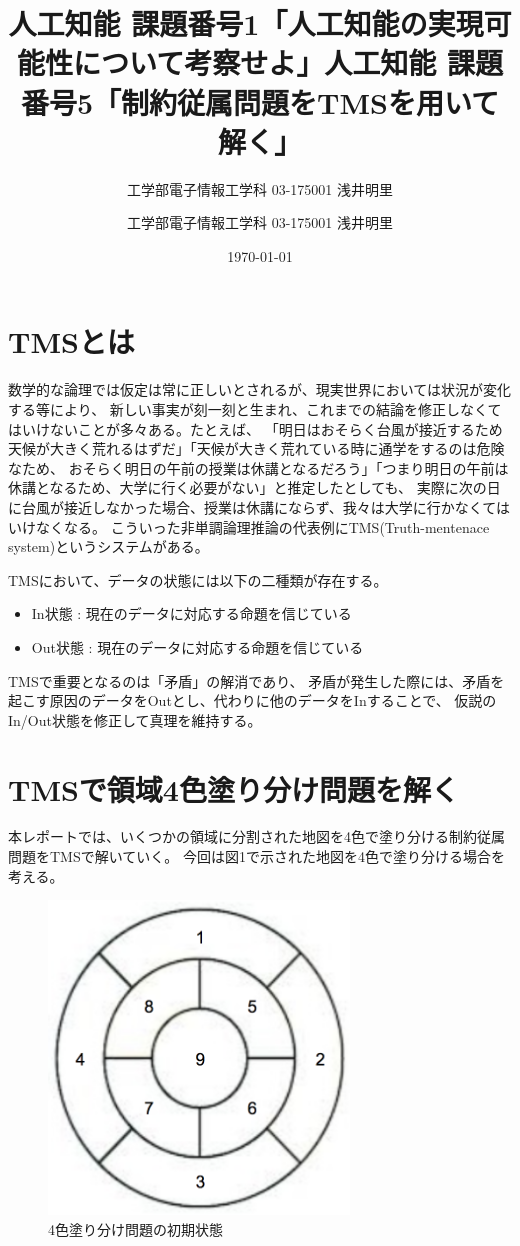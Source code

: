 \documentclass[uplatex]{jsarticle}
\title{人工知能 課題番号1「人工知能の実現可能性について考察せよ」}
\author{工学部電子情報工学科 03-175001 浅井明里}
\title{人工知能 課題番号5「制約従属問題をTMSを用いて解く」}
\author{工学部電子情報工学科 03-175001 浅井明里}
\date{\today}
\makeatletter
\def\maketitle{%
  \null
  \thispagestyle{empty}%
  \vfill
  \begin{center}\leavevmode
    \normalfont
    {\LARGE \@title\par}%
    \vskip 1cm
    {\Large \@author\par}%
    \vskip 1cm
    {\Large \@date\par}%
  \end{center}%
  \vfill
  \null
  \@thanks%
  \cleardoublepage
  }
\makeatother
\begin{document}
\maketitle

\section{TMSとは}
数学的な論理では仮定は常に正しいとされるが、現実世界においては状況が変化する等により、
新しい事実が刻一刻と生まれ、これまでの結論を修正しなくてはいけないことが多々ある。たとえば、
「明日はおそらく台風が接近するため天候が大きく荒れるはずだ」「天候が大きく荒れている時に通学をするのは危険なため、
おそらく明日の午前の授業は休講となるだろう」「つまり明日の午前は休講となるため、大学に行く必要がない」と推定したとしても、
実際に次の日に台風が接近しなかった場合、授業は休講にならず、我々は大学に行かなくてはいけなくなる。
こういった非単調論理推論の代表例にTMS(Truth-mentenace system)というシステムがある。

TMSにおいて、データの状態には以下の二種類が存在する。
\begin{itemize}
  \item In状態 : 現在のデータに対応する命題を信じている
  \item Out状態 : 現在のデータに対応する命題を信じている
\end{itemize}
TMSで重要となるのは「矛盾」の解消であり、
矛盾が発生した際には、矛盾を起こす原因のデータをOutとし、代わりに他のデータをInすることで、
仮説のIn/Out状態を修正して真理を維持する。

\section{TMSで領域4色塗り分け問題を解く}
本レポートでは、いくつかの領域に分割された地図を4色で塗り分ける制約従属問題をTMSで解いていく。
今回は図1で示された地図を4色で塗り分ける場合を考える。
\begin{figure}
  \begin{center}
    \includegraphics[width=8cm]{img/color_default.png}
    \caption{4色塗り分け問題の初期状態}
  \end{center}
\end{figure}
\end{document}
